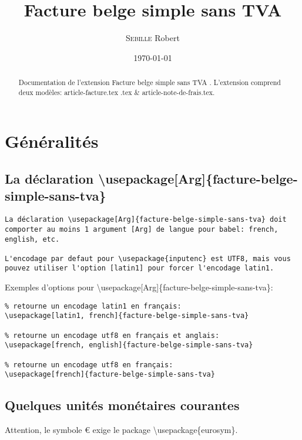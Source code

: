 \documentclass[a4paper,10pt]{article}
\author{\textsc{Sebille} Robert}
\date{\today}
\title{Facture belge simple sans TVA}
\begin{document}
\maketitle

\begin{abstract}
Documentation de l'extension \og Facture belge simple sans \textsc{TVA} \fg. L'extension comprend deux modèles: article-facture.tex .tex \& article-note-de-frais.tex.
\end{abstract}


\tableofcontents
\newpage

\section{Généralités}
\subsection{La déclaration \textbackslash usepackage[Arg]\{facture-belge-simple-sans-tva\}}

\begin{lstlisting}
La déclaration \usepackage[Arg]{facture-belge-simple-sans-tva} doit comporter au moins 1 argument [Arg] de langue pour babel: french, english, etc.  

L'encodage par defaut pour \usepackage{inputenc} est UTF8, mais vous pouvez utiliser l'option [latin1] pour forcer l'encodage latin1.
\end{lstlisting}


\noindent
Exemples d'options pour \textbackslash usepackage[Arg]\{facture-belge-simple-sans-tva\}:

\begin{lstlisting}
% retourne un encodage latin1 en français:
\usepackage[latin1, french]{facture-belge-simple-sans-tva} 

% retourne un encodage utf8 en français et anglais:
\usepackage[french, english]{facture-belge-simple-sans-tva}

% retourne un encodage utf8 en français:    
\usepackage[french]{facture-belge-simple-sans-tva} 
\end{lstlisting}

\subsection{Quelques unités monétaires courantes}%
\label{sub:unites_monetaire_courantes}

Attention, le symbole \euro{} exige le package \textbackslash usepackage\{eurosym\}.%
\end{document}
